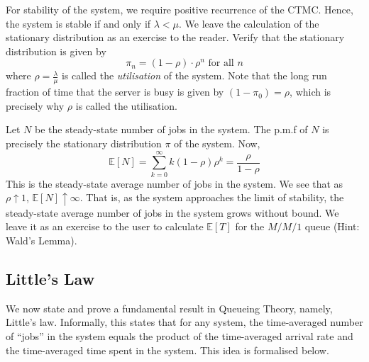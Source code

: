 \documentclass[12pt]{article}
\def\E{\mathbb{E}}
\theoremstyle{definition}
\begin{document}
\begin{center}
\end{center}

For stability of the system, we require positive recurrence of the CTMC. Hence, the system is stable if and only if $\lambda < \mu$. We leave the calculation of the stationary distribution as an exercise to the reader. Verify that the stationary distribution is given by
\[
    \pi_n = (1-\rho) \cdot \rho^n \text{ for all } n 
\]
where $\rho = \frac{\lambda}{\mu}$ is called the \emph{utilisation} of the system. Note that the long run fraction of time that the server is busy is given by $(1-\pi_0) = \rho$, which is precisely why $\rho$ is called the utilisation.

Let $N$ be the steady-state number of jobs in the system. The p.m.f of $N$ is precisely the stationary distribution $\pi$ of the system. Now,
\[
    \E[N] = \sum_{k=0}^{\infty} k(1-\rho)\rho^k = \frac{\rho}{1-\rho}
\]
This is the steady-state average number of jobs in the system. We see that as $\rho \uparrow 1$, $\E[N] \uparrow \infty$. That is, as the system approaches the limit of stability, the steady-state average number of jobs in the system grows without bound. We leave it as an exercise to the user to calculate $\E[T]$ for the $M/M/1$ queue (Hint: Wald's Lemma).

\subsection{Little's Law}

We now state and prove a fundamental result in Queueing Theory, namely, Little's law. Informally, this states that for any system, the time-averaged number of ``jobs'' in the system equals the product of the time-averaged arrival rate and the time-averaged time spent in the system. This idea is formalised below.
\end{document}
